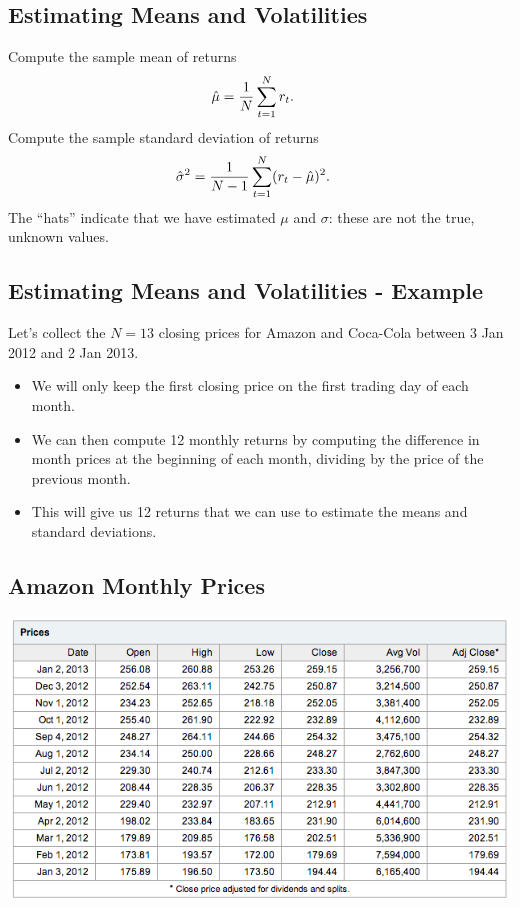 \documentclass[letterpaper,10pt,english]{sphinxmanual}
\begin{document}
\subsection{Estimating Means and Volatilities}
\label{risk:id1}
Compute the sample mean of returns
\begin{gather}
\begin{split}\hat{\mu} & = \frac{1}{N} \sum_{t=1}^N r_t.\end{split}\notag
\end{gather}
Compute the sample standard deviation of returns
\begin{gather}
\begin{split}\hat{\sigma}^2 & = \frac{1}{N-1} \sum_{t=1}^N (r_t -
\hat{\mu})^2.\end{split}\notag
\end{gather}
The ``hats'' indicate that we have estimated $\mu$ and
$\sigma$: these are not the true, unknown values.


\subsection{Estimating Means and Volatilities - Example}
\label{risk:estimating-means-and-volatilities-example}
Let's collect the $N = 13$ closing prices for Amazon and
Coca-Cola between 3 Jan 2012 and 2 Jan 2013.
\begin{itemize}
\item {} 
We will only keep the first closing price on the first trading day
of each month.

\end{itemize}
\begin{itemize}
\item {} 
We can then compute 12 monthly returns by computing the difference
in month prices at the beginning of each month, dividing by the
price of the previous month.

\end{itemize}
\begin{itemize}
\item {} 
This will give us 12 returns that we can use to estimate the means
and standard deviations.

\end{itemize}


\subsection{Amazon Monthly Prices}
\label{risk:amazon-monthly-prices}
\includegraphics[width=6in]{amzn-monthly.png}
\end{document}
